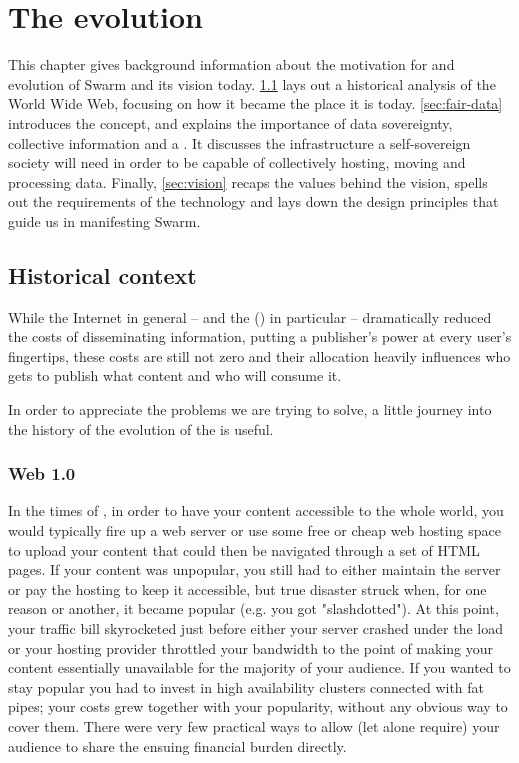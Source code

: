 \chapter{The evolution  \statusgreen}\label{chap:vision}



This chapter gives background information about the motivation for and evolution of Swarm and its vision today. \ref{sec:historical_context} lays out a historical analysis of the World Wide Web, focusing on how it became the place it is today.
\ref{sec:fair-data} introduces the concept, and explains the importance of data sovereignty, collective information and a . It discusses the infrastructure a self-sovereign society will need in order to be capable of collectively hosting, moving and processing data.
Finally, \ref{sec:vision} recaps the values behind the vision, spells out the requirements of the technology and lays down the design principles that guide us in manifesting Swarm.

\section{Historical context  \statusgreen}\label{sec:historical_context}
\green{}
While the Internet in general – and the  () in particular – dramatically reduced the costs of disseminating information, putting a publisher's power at every user's fingertips, these costs are still not zero and their allocation heavily influences who gets to publish what content and who will consume it.

In order to appreciate the problems we are trying to solve, a little journey into the history of the evolution of the  is useful.

\subsection{Web 1.0 \statusgreen}\label{sec:web_1}

In the times of , in order to have your content accessible to the whole world, you would typically fire up a web server or use some free or cheap web hosting space to upload your content that could then be navigated through a set of HTML pages. If your content was unpopular, you still had to either maintain the server or pay the hosting to keep it accessible, but true disaster struck when, for one reason or another, it became popular (e.g. you got "slashdotted"). At this point, your traffic bill skyrocketed just before either your server crashed under the load or your hosting provider throttled your bandwidth to the point of making your content essentially unavailable for the majority of your audience. If you wanted to stay popular you had to invest in high availability clusters connected with fat pipes; your costs grew together with your popularity, without any obvious way to cover them. There were very few practical ways to allow (let alone require) your audience to share the ensuing financial burden directly.

